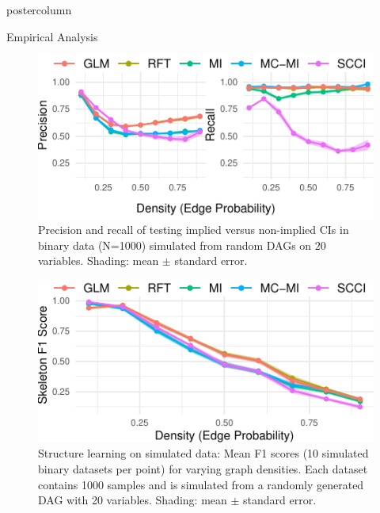 \documentclass{beamer}
\newlength{\columnheight}
\begin{document}
\begin{frame}
\begin{columns}
	\begin{column}{0.33\textwidth}
		\begin{beamercolorbox}[center]{postercolumn}
			\begin{minipage}{.98\textwidth} %
				\parbox[t][\columnheight]{\textwidth}{ %
					\begin{myblock}{Empirical Analysis}
						\begin{figure}
							\centering
							\includegraphics[scale=2.5]{../in_person/imgs/model_testing.pdf}
							\caption{Precision and recall of testing implied versus non-implied CIs
								 in binary data (N=1000) simulated from random DAGs on $ 20 $ variables.
								 Shading: mean $\pm$ standard error.} 
							\label{fig:model_testing}
						\end{figure}
						\begin{figure}
							\centering
							\includegraphics[scale=2.5]{../in_person/imgs/sl_density.pdf}
							\caption{Structure learning on simulated data: Mean F1 scores (10
								 simulated binary datasets per point) for varying graph densities. Each
								 dataset contains 1000 samples and is simulated from a randomly
								 generated DAG with 20 variables. Shading: mean $\pm$ standard error.}
							\label{fig:sl_density}
						\end{figure}

\end{myblock}}
\end{minipage}
\end{beamercolorbox}
\end{column}
\end{columns}
\end{frame}
\end{document}
